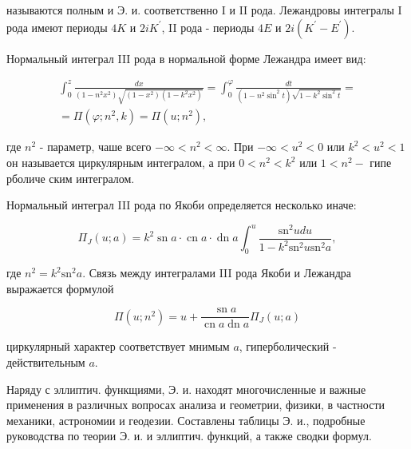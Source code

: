 \documentclass[10pt]{article}
\begin{document}
называются полным и Э. и. соответственно I и II рода. Лежандровы интегралы I рода имеют периоды $4 K$ и $2 i K^{\prime}$, II рода - периоды $4 E$ и $2 i\left(K^{\prime}-E^{\prime}\right)$.



Нормальный интеграл III рода в нормальной форме Лежандра имеет вид:



\[

\begin{gathered}

\int_{0}^{z} \frac{d x}{\left(1-n^{2} x^{2}\right) \sqrt{\left(1-x^{2}\right)\left(1-k^{2} x^{2}\right)}}=\int_{0}^{\varphi} \frac{d t}{\left(1-n^{2} \sin ^{2} t\right) \sqrt{1-k^{2} \sin ^{2} t}}= \\

=\Pi\left(\varphi ; n^{2}, k\right)=\Pi\left(u ; n^{2}\right),

\end{gathered}

\]



где $n^{2}$ - параметр, чаше всего $-\infty<n^{2}<\infty$. При $-\infty<u^{2}<0$ или $k^{2}<u^{2}<1$ он называется циркулярным интегралом, а при $0<n^{2}<k^{2}$ или $1<n^{2}-$ гипе рболиче ским интегралом.



Нормальный интеграл III рода по Якоби определяется несколько иначе:



\[

\Pi_{J}(u ; a)=k^{2} \operatorname{sn} a \cdot \operatorname{cn} a \cdot \operatorname{dn} a \int_{0}^{u} \frac{\mathrm{sn}^{2} u d u}{1-k^{2} \mathrm{sn}^{2} u \mathrm{sn}^{2} a},

\]



где $n^{2}=k^{2} \mathrm{sn}^{2} a$. Связь между интегралами III рода Якоби и Лежандра выражается формулой



\[

\Pi\left(u ; n^{2}\right)=u+\frac{\operatorname{sn} a}{\operatorname{cn} a \operatorname{dn} a} \Pi_{J}(u ; a)

\]



циркулярный характер соответствует мнимым $a$, гиперболический - действительным $a$.



Наряду с эллиптич. функщиями, Э. и. находят многочисленные и важные применения в различных вопросах анализа и геометрии, физики, в частности механики, астрономии и геодезии. Составлены таблицы Э. и., подробные руководства по теории Э. и. и эллиптич. функций, а также сводки формул.
\end{document}
